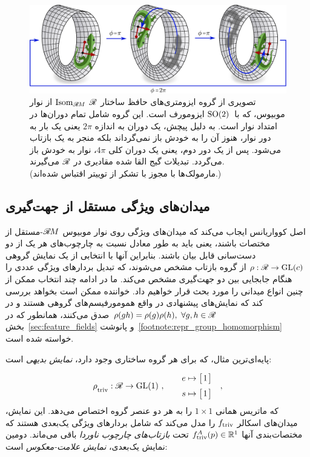 \begin{figure}
	\centering
	\includegraphics[width=\columnwidth]{figures/mobius_conv_isom.pdf}
	\caption{\small
		تصویری از گروه ایزومتری‌های حافظ ساختار $\mathscr{R}$ $\operatorname{Isom}_{\mathscr{R}\mkern-1.8muM}$ از نوار موبیوس، که با~$\operatorname{SO}(2)$ ایزومورف است.
		این گروه شامل تمام دوران‌ها در امتداد نوار است.
		به دلیل پیچش، یک دوران به اندازه $2\pi$ یعنی یک بار به دور نوار، هنوز آن را به خودش باز نمی‌گرداند بلکه منجر به یک بازتاب می‌شود.
		پس از یک دور دوم، یعنی یک دوران کلی $4\pi$، نوار به خودش باز می‌گردد.
		تبدیلات گیج القا شده مقادیری در $\mathscr{R}$ می‌گیرند.
		{
			\\ \color{gray} \scriptsize
			(مارمولک‌ها با مجوز \href{https://github.com/twitter/twemoji/blob/gh-pages/LICENSE-GRAPHICS}{} با تشکر از توییتر اقتباس شده‌اند.)
		}
	}
	\label{fig:mobius_conv_isometries}
\end{figure}

\subsection{میدان‌های ویژگی مستقل از جهت‌گیری}
\label{sec:mobius_representations}

اصل کوواریانس ایجاب می‌کند که میدان‌های ویژگی روی نوار موبیوس $\mathscr{R}\mkern-1.8muM$-مستقل از مختصات باشند، یعنی باید به طور معادل نسبت به چارچوب‌های هر یک از دو دست‌سانی قابل بیان باشند.
بنابراین آنها با انتخابی از یک نمایش گروهی $\rho: \mathscr{R} \to \operatorname{GL}(c)$ از گروه بازتاب مشخص می‌شوند، که تبدیل بردارهای ویژگی عددی را هنگام جابجایی بین دو جهت‌گیری مشخص می‌کند.
ما در ادامه چند انتخاب ممکن از چنین انواع میدانی را مورد بحث قرار خواهیم داد.
خواننده ممکن است بخواهد بررسی کند که نمایش‌های پیشنهادی در واقع همومورفیسم‌های گروهی هستند و در $\rho(gh) = \rho(g)\rho(h),\ \forall g,h\in \mathscr{R}$ صدق می‌کنند، همانطور که در بخش~\ref{sec:feature_fields} و پانوشت~\ref{footnote:repr_group_homomorphism} خواسته شده است.

پایه‌ای‌ترین مثال، که برای هر گروه ساختاری وجود دارد، \emph{نمایش بدیهی} است:

\begin{align}
	\rho_{\overset{}{\textup{triv}}}: \mathscr{R} \to \operatorname{GL}(1)\ , \qquad 
	\begin{aligned}
		e &\mapsto \big[\mkern2mu 1 \mkern2mu\big] \\[2pt]
		s &\mapsto \big[\mkern2mu 1 \mkern2mu\big] \\
	\end{aligned}
	\quad ,
\end{align}
که ماتریس همانی {$1\times1$} را به هر دو عنصر گروه اختصاص می‌دهد.
این نمایش، میدان‌های اسکالر $f_{\textup{triv}}$ را مدل می‌کند که شامل بردارهای ویژگی یک‌بعدی هستند که مختصات‌بندی آنها $f^A_{\textup{triv}}(p) \in \mathbb{R}^1$ تحت \emph{بازتاب‌های چارچوب ناوردا} باقی می‌ماند.
دومین نمایش یک‌بعدی، \emph{نمایش علامت-معکوس} است:


